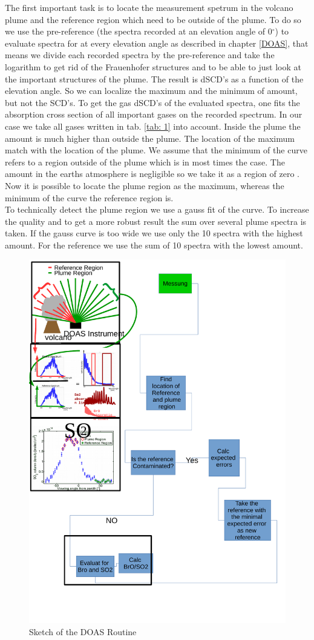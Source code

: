 \documentclass  [
  paper    = a4,
  BCOR     = 10mm,
  twoside,
  fontsize = 12pt,
  fleqn,
  toc      = bibnumbered,
  toc      = listofnumbered,
  numbers  = noendperiod,
  headings = normal,
  listof   = leveldown,
  version  = 3.03
]                                       {scrreprt}
\begin{document}
	The first important task is to locate the measurement spetrum in the volcano plume and the reference region which need to be outside of the plume. 
	To do so we use the pre-reference (the spectra recorded at an elevation angle of  0$^{\circ} $) to evaluate spectra for  at every elevation angle as described in chapter \ref{DOAS}, that means we divide each recorded spectra by the pre-reference and take the logarithm  to get rid of the Frauenhofer structures and to be able to just look at the important structures of the plume. The result is  dSCD's as a function of the elevation angle. So we can localize the maximum and the minimum of  amount, but not the SCD's.  To get the gas dSCD's of the evaluated spectra, one fits the absorption cross section of all important gases on the recorded spectrum. In our case we take all gases written in tab. \ref{tab: 1} into account.
	 Inside the plume the  amount is much higher than outside the plume.  The location of the  maximum match with the location of the plume. We assume that the minimum of the  curve refers to a region outside of the plume which is in most times the case. The  amount in the earths atmosphere is negligible so we take it as a region of zero . Now it is possible to locate the plume region as the  maximum, whereas the minimum of the  curve the reference region is. \\
	To technically detect the plume region we use a gauss fit of the  curve.
	To increase the quality and to get a more robust result the sum over several plume spectra is taken. If the gauss curve is too wide we use only the 10 spectra with the highest  amount. For the reference we use the sum of 10 spectra with the lowest  amount.\\
	\begin{figure}
		\centering
		\includegraphics[width=0.7\linewidth]{Bilder/DOAS_Routine}
		\caption{Sketch of the DOAS Routine }
		\label{fig:FlussDiag}
	\end{figure}
\end{document}
